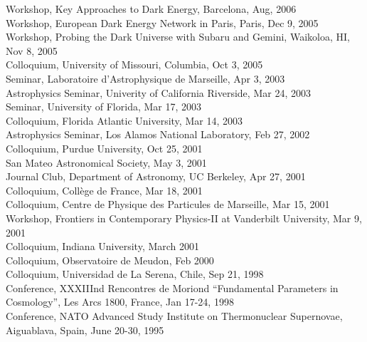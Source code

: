 \documentclass[line, margin]{res}
\begin{document}
\begin{resume}
Workshop, Key Approaches to Dark Energy, Barcelona,  Aug, 2006\\
Workshop, European Dark Energy Network in Paris, Paris, Dec 9, 2005 \\
Workshop, Probing the Dark Universe with Subaru and Gemini, Waikoloa, HI, Nov 8, 2005\\
Colloquium, University of Missouri, Columbia, Oct 3, 2005\\
Seminar, Laboratoire d'Astrophysique de Marseille, Apr 3, 2003\\
Astrophysics Seminar, Univerity of California Riverside, Mar 24, 2003\\
Seminar, University of Florida, Mar 17, 2003\\
Colloquium, Florida Atlantic University, Mar 14, 2003\\
Astrophysics Seminar, Los Alamos National Laboratory, Feb 27, 2002\\
Colloquium, Purdue University, Oct 25, 2001\\
San Mateo Astronomical Society, May 3, 2001\\
Journal Club, Department of Astronomy, UC Berkeley, Apr 27, 2001\\
Colloquium, Coll\`ege de France, Mar 18, 2001\\
Colloquium, Centre de Physique des Particules de Marseille, Mar 15, 2001\\
Workshop, Frontiers in Contemporary Physics-II at Vanderbilt University, Mar 9, 2001\\
Colloquium, Indiana University, March 2001\\
Colloquium, Observatoire de Meudon, Feb 2000\\
Colloquium, Universidad de La Serena,
Chile, Sep 21, 1998\\
Conference,  XXXIIInd
Rencontres de Moriond ``Fundamental Parameters in Cosmology'',
Les Arcs 1800, France, Jan 17-24, 1998\\
Conference, NATO Advanced Study Institute on Thermonuclear Supernovae, Aiguablava,
Spain, June 20-30, 1995\\


\end{resume}
\end{document}
